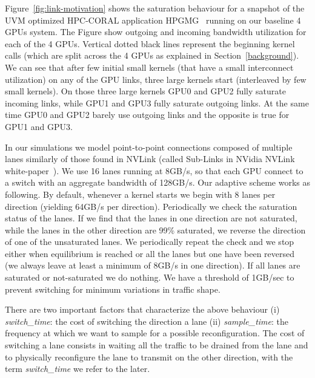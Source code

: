 Figure~\ref{fig:link-motivation} shows the saturation behaviour for a 
snapshot of the UVM optimized HPC-CORAL application 
HPGMG~\cite{adams2014hpgmg} running on our baseline 4 GPUs system. The Figure 
show outgoing and incoming bandwidth utilization for each of the 4 GPUs. 
Vertical dotted black lines represent the beginning kernel calls (which are 
split across the 4 GPUs as explained in Section~\ref{background}). We can see 
that after few initial small kernels (that have a small interconnect 
utilization) on any of the GPU links, three large kernels start (interleaved 
by few small kernels). On those three large kernels GPU0 and GPU2 fully 
saturate incoming links, while GPU1 and GPU3 fully saturate outgoing links. 
At the same time GPU0 and GPU2 barely use outgoing links and the opposite is 
true for GPU1 and GPU3.

In our simulations we model point-to-point connections composed of multiple 
lanes similarly of those found in NVLink (called Sub-Links in NVidia NVLink 
white-paper~\cite{pascal-tesla-wp}). We use 16 lanes running at 8GB/s, so 
that each GPU connect to a switch with an aggregate bandwidth of 128GB/s. 
Our adaptive scheme works as following. By default, whenever a kernel starts 
we begin with 8 lanes per direction (yielding 64GB/s per direction). 
Periodically we check the saturation status of the lanes. If we find that 
the lanes in one direction are not saturated, while the lanes in the other 
direction are 99\% saturated, we reverse the direction of one of the 
unsaturated lanes. We periodically repeat the check and we stop either when 
equilibrium is reached or all the lanes but one have been reversed (we always 
leave at least a minimum of 8GB/s in one direction). If all 
lanes are saturated or not-saturated we do nothing. We have a threshold of 
1GB/sec to prevent switching for minimum variations in traffic shape.

There are two important factors that characterize the above behaviour (i) 
\emph{switch\_time}: the cost of switching the direction a lane (ii) 
\emph{sample\_time}: the frequency at which we want to sample for a possible 
reconfiguration. The cost of switching a lane consists in waiting all 
the traffic to be drained from the lane and to physically reconfigure the 
lane to transmit on the other direction, with the term \emph{switch\_time} we 
refer to the later. 



